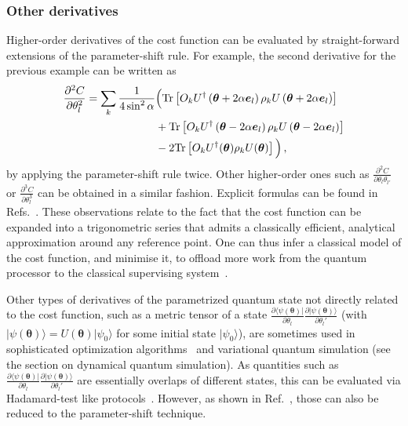 \documentclass[prx,twocolumn,floatfix,superscriptaddress,longbibliography]{revtex4-1}
\renewcommand{\vec}[1]{\boldsymbol{#1}}  %
\newcommand{\<}{\langle}
\renewcommand{\>}{\rangle}
\newcommand{\ket}[1]{|#1\rangle}               %
\newcommand{\bra}[1]{\langle #1|}              %
\newcommand{\Tr}{{\rm Tr}}
\renewcommand{\vec}[1]{\boldsymbol{#1}}  %
\newcommand{\ad}{^\dagger}
\begin{document}
\subsubsection{ Other derivatives}  Higher-order derivatives of the cost function can be evaluated by straight-forward extensions of the parameter-shift rule.     For example, the second derivative for the previous example can be written as
\small
\begin{align}
    \frac{\partial^2 C}{\partial \theta_l^2} = \sum_k\frac{1}{4\sin^2\alpha}&\Big( \Tr\left[O_k U\ad\left(\vec{\theta}+2\alpha\vec{e}_l\right)\rho_k U\left(\vec{\theta}+2\alpha\vec{e}_l\right)\right]\nonumber \\
    & + \Tr\left[O_k U\ad\left(\vec{\theta}-2\alpha\vec{e}_l\right) \rho_k U\left(\vec{\theta}-2\alpha\vec{e}_l\right)\right]\nonumber\\
    &- 2\Tr\left[O_k U\ad(\vec{\theta}) \rho_k U(\vec{\theta})\right]\Big)\,,\nonumber
\end{align}
\normalsize
by applying the parameter-shift rule twice.
Other higher-order ones such as $\frac{\partial^2 C}{\partial \theta_l\theta_{l'}}$ or $\frac{\partial^3 C}{\partial \theta_l^3}$ can be obtained in a similar fashion. Explicit formulas can be found in Refs.~\cite{cerezo2020impact,mari2020estimating}. These observations relate to the fact that the cost function can be expanded into a trigonometric series that admits a classically efficient, analytical approximation around any reference point. One can thus infer a classical model of the cost function, and minimise it, to offload more work from the quantum processor to the classical supervising system~\cite{nakanishi2019,koczor2020qad}.

Other types of derivatives of the parametrized quantum state not directly related to the cost function, such as a metric tensor of a state $\frac{\partial \bra{\psi(\vec{\theta})}}{\partial \theta_l}\frac{\partial \ket{\psi(\vec{\theta})}}{\partial \theta_l'}$ (with $\ket{\psi(\vec{\theta})}=U(\vec{\theta})\ket{\psi_0}$ for some initial state $\ket{\psi_0}$), are sometimes used in sophisticated optimization algorithms~\cite{mcardle2019variational, stokes2019quantum, koczor2019quantum}  and variational quantum simulation \cite{li2017efficient,yuan2019theory,endo2018variational} (see the section on dynamical quantum simulation). 
As quantities such as $\frac{\partial \bra{\psi(\vec{\theta})}}{\partial \theta_l}\frac{\partial \ket{\psi(\vec{\theta})}}{\partial \theta_l'}$ are essentially overlaps of different states, this can be evaluated via Hadamard-test like protocols~\cite{yuan2019theory}.
However, as shown in Ref.~\cite{mitarai2019methodology}, those can also be reduced to the parameter-shift technique.
\end{document}
